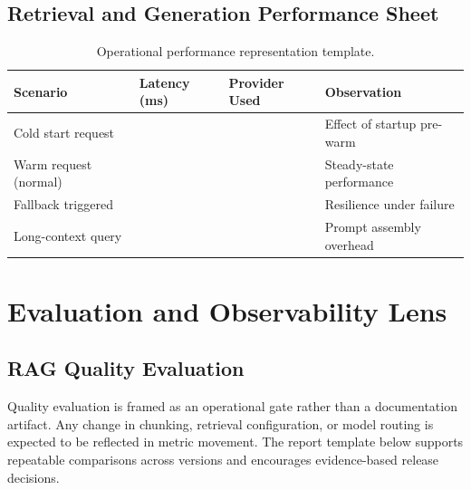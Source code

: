 \documentclass[12pt,letterpaper]{report}
\begin{document}
\subsection{Retrieval and Generation Performance Sheet}
\begin{table}[h]
\centering
\begin{tabular}{p{}p{}p{}p{}}
\hline
\textbf{Scenario} & \textbf{Latency (ms)} & \textbf{Provider Used} & \textbf{Observation} \\
\hline
Cold start request & \underline{\hspace{2cm}} & \underline{\hspace{2cm}} & Effect of startup pre-warm \\
Warm request (normal) & \underline{\hspace{2cm}} & \underline{\hspace{2cm}} & Steady-state performance \\
Fallback triggered & \underline{\hspace{2cm}} & \underline{\hspace{2cm}} & Resilience under failure \\
Long-context query & \underline{\hspace{2cm}} & \underline{\hspace{2cm}} & Prompt assembly overhead \\
\hline
\end{tabular}
\caption{Operational performance representation template.}
\end{table}

\section{Evaluation and Observability Lens}
\subsection{RAG Quality Evaluation}
Quality evaluation is framed as an operational gate rather than a documentation artifact. Any change in chunking, retrieval configuration, or model routing is expected to be reflected in metric movement. The report template below supports repeatable comparisons across versions and encourages evidence-based release decisions.
\end{document}
